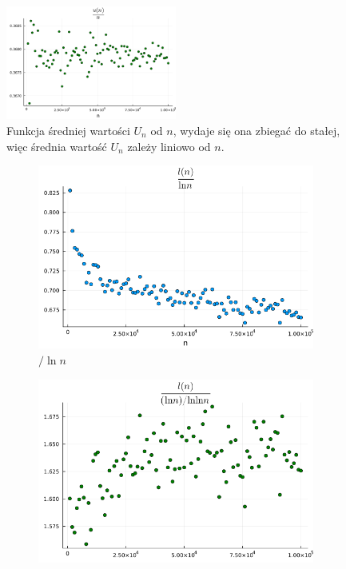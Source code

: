 \documentclass{article}
\begin{document}
\begin{figure}[h]
    \centering
    \includegraphics[width=0.5\textwidth]{../results/u(n)_1.png}
    \caption{Funkcja średniej wartości $U_n$ od $n$, wydaje się ona zbiegać do stałej, więc średnia wartość $U_n$ zależy liniowo od $n$. }
\end{figure}

\begin{figure}[h]
    \centering
    \begin{subfigure}{0.32\textwidth}
        \centering
        \includegraphics[width=1.0\textwidth]{../results/l(n)_1.png}
        \caption{$/\ln n$}
    \end{subfigure}
    \begin{subfigure}{0.32\textwidth}
        \centering
        \includegraphics[width=1.0\textwidth]{../results/l(n)_2.png}

\end{subfigure}
\end{figure}
\end{document}
